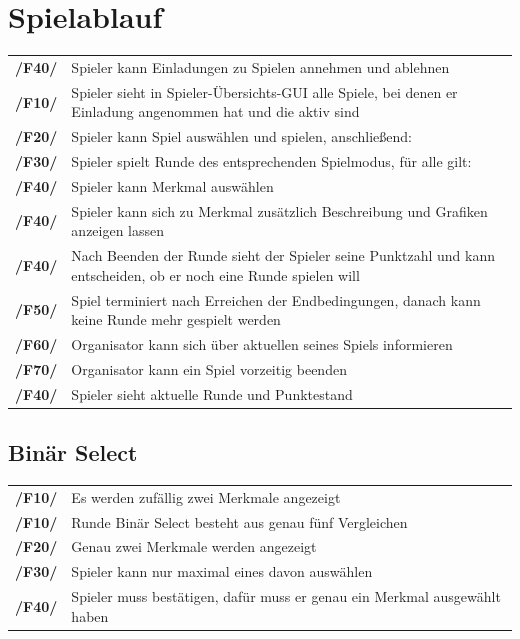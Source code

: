 \documentclass[a4paper]{scrreprt}
\begin{document}
    \section{Spielablauf} 
    \begin{tabularx}{\linewidth}{@{}>{\bfseries}l@{\hspace{.5em}}X@{}} %
    	/F40/ & \Gls{Spieler} kann Einladungen zu Spielen annehmen und ablehnen \\
    	/F10/ & \Gls{Spieler} sieht in Spieler-Übersichts-GUI alle Spiele, bei denen er Einladung angenommen hat und die aktiv sind \\
    	/F20/ & \Gls{Spieler} kann Spiel auswählen und spielen, anschließend: \\
    	/F30/ & \Gls{Spieler} spielt Runde des entsprechenden \Gls{Spielmodus}, für alle gilt: \\
    	/F40/ & \Gls{Spieler} kann Merkmal auswählen \\
    	/F40/ & \Gls{Spieler} kann sich zu Merkmal zusätzlich Beschreibung und Grafiken anzeigen lassen \\
    	/F40/ & Nach Beenden der Runde sieht der \Gls{Spieler} seine Punktzahl und kann entscheiden, ob er noch eine Runde spielen will \\
	/F50/ & Spiel terminiert nach Erreichen der Endbedingungen, danach kann keine Runde mehr gespielt werden \\
	/F60/ & \Gls{Organisator} kann sich über aktuellen seines Spiels informieren \\ %
	/F70/ & \Gls{Organisator} kann ein Spiel vorzeitig beenden \\
	/F40/ & \Gls{Spieler} sieht aktuelle Runde und Punktestand \\
    \end{tabularx}
    
    \subsection{Binär Select}
    \begin{tabularx}{\linewidth}{@{}>{\bfseries}l@{\hspace{.5em}}X@{}} %
    	/F10/ & Es werden zufällig zwei Merkmale angezeigt \\
    	/F10/ & Runde Binär Select besteht aus genau fünf Vergleichen \\
    	/F20/ & Genau zwei Merkmale werden angezeigt \\
    	/F30/ & \Gls{Spieler} kann nur maximal eines davon auswählen \\
    	/F40/ & \Gls{Spieler} muss bestätigen, dafür muss er genau ein Merkmal ausgewählt haben \\
    \end{tabularx}
\end{document}
